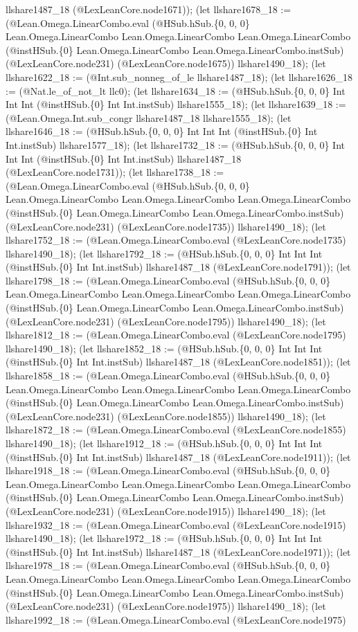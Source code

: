 \documentclass[11pt]{article}
\begin{document}
llshare1487\_18 (@LexLeanCore.node1671)); (let llshare1678\_18 := (@Lean.Omega.LinearCombo.eval (@HSub.hSub.\{0, 0, 0\} Lean.Omega.LinearCombo Lean.Omega.LinearCombo Lean.Omega.LinearCombo (@instHSub.\{0\} Lean.Omega.LinearCombo Lean.Omega.LinearCombo.instSub) (@LexLeanCore.node231) (@LexLeanCore.node1675)) llshare1490\_18); (let llshare1622\_18 := (@Int.sub\_nonneg\_of\_le llshare1487\_18); (let llshare1626\_18 := (@Nat.le\_of\_not\_lt llc0); (let llshare1634\_18 := (@HSub.hSub.\{0, 0, 0\} Int Int Int (@instHSub.\{0\} Int Int.instSub) llshare1555\_18); (let llshare1639\_18 := (@Lean.Omega.Int.sub\_congr llshare1487\_18 llshare1555\_18); (let llshare1646\_18 := (@HSub.hSub.\{0, 0, 0\} Int Int Int (@instHSub.\{0\} Int Int.instSub) llshare1577\_18); (let llshare1732\_18 := (@HSub.hSub.\{0, 0, 0\} Int Int Int (@instHSub.\{0\} Int Int.instSub) llshare1487\_18 (@LexLeanCore.node1731)); (let llshare1738\_18 := (@Lean.Omega.LinearCombo.eval (@HSub.hSub.\{0, 0, 0\} Lean.Omega.LinearCombo Lean.Omega.LinearCombo Lean.Omega.LinearCombo (@instHSub.\{0\} Lean.Omega.LinearCombo Lean.Omega.LinearCombo.instSub) (@LexLeanCore.node231) (@LexLeanCore.node1735)) llshare1490\_18); (let llshare1752\_18 := (@Lean.Omega.LinearCombo.eval (@LexLeanCore.node1735) llshare1490\_18); (let llshare1792\_18 := (@HSub.hSub.\{0, 0, 0\} Int Int Int (@instHSub.\{0\} Int Int.instSub) llshare1487\_18 (@LexLeanCore.node1791)); (let llshare1798\_18 := (@Lean.Omega.LinearCombo.eval (@HSub.hSub.\{0, 0, 0\} Lean.Omega.LinearCombo Lean.Omega.LinearCombo Lean.Omega.LinearCombo (@instHSub.\{0\} Lean.Omega.LinearCombo Lean.Omega.LinearCombo.instSub) (@LexLeanCore.node231) (@LexLeanCore.node1795)) llshare1490\_18); (let llshare1812\_18 := (@Lean.Omega.LinearCombo.eval (@LexLeanCore.node1795) llshare1490\_18); (let llshare1852\_18 := (@HSub.hSub.\{0, 0, 0\} Int Int Int (@instHSub.\{0\} Int Int.instSub) llshare1487\_18 (@LexLeanCore.node1851)); (let llshare1858\_18 := (@Lean.Omega.LinearCombo.eval (@HSub.hSub.\{0, 0, 0\} Lean.Omega.LinearCombo Lean.Omega.LinearCombo Lean.Omega.LinearCombo (@instHSub.\{0\} Lean.Omega.LinearCombo Lean.Omega.LinearCombo.instSub) (@LexLeanCore.node231) (@LexLeanCore.node1855)) llshare1490\_18); (let llshare1872\_18 := (@Lean.Omega.LinearCombo.eval (@LexLeanCore.node1855) llshare1490\_18); (let llshare1912\_18 := (@HSub.hSub.\{0, 0, 0\} Int Int Int (@instHSub.\{0\} Int Int.instSub) llshare1487\_18 (@LexLeanCore.node1911)); (let llshare1918\_18 := (@Lean.Omega.LinearCombo.eval (@HSub.hSub.\{0, 0, 0\} Lean.Omega.LinearCombo Lean.Omega.LinearCombo Lean.Omega.LinearCombo (@instHSub.\{0\} Lean.Omega.LinearCombo Lean.Omega.LinearCombo.instSub) (@LexLeanCore.node231) (@LexLeanCore.node1915)) llshare1490\_18); (let llshare1932\_18 := (@Lean.Omega.LinearCombo.eval (@LexLeanCore.node1915) llshare1490\_18); (let llshare1972\_18 := (@HSub.hSub.\{0, 0, 0\} Int Int Int (@instHSub.\{0\} Int Int.instSub) llshare1487\_18 (@LexLeanCore.node1971)); (let llshare1978\_18 := (@Lean.Omega.LinearCombo.eval (@HSub.hSub.\{0, 0, 0\} Lean.Omega.LinearCombo Lean.Omega.LinearCombo Lean.Omega.LinearCombo (@instHSub.\{0\} Lean.Omega.LinearCombo Lean.Omega.LinearCombo.instSub) (@LexLeanCore.node231) (@LexLeanCore.node1975)) llshare1490\_18); (let llshare1992\_18 := (@Lean.Omega.LinearCombo.eval (@LexLeanCore.node1975) 
\end{document}
